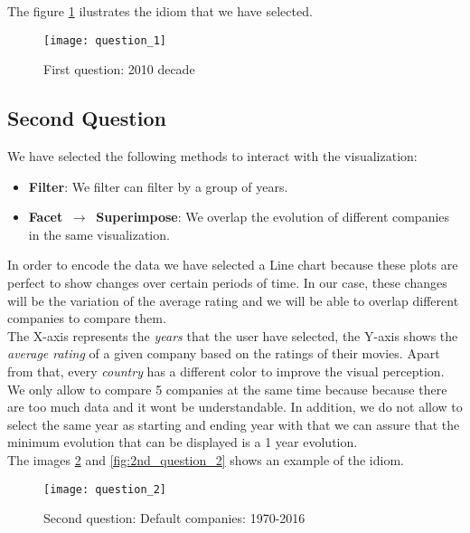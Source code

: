 The figure \ref{fig:1st_question} ilustrates the idiom that we have selected.

\begin{figure}[H]
	\texttt{[image: question\_1]}
	\caption{First question: 2010 decade}
	\label{fig:1st_question}
\end{figure}

\subsection{Second Question}

We have selected the following methods to interact with the visualization:

\begin{itemize}
	\item \textbf{Filter}: We filter can filter by a group of years.
	\item \textbf{Facet $\,\to\,$ Superimpose}: We overlap the evolution of different companies in the same visualization.
\end{itemize}

In order to encode the data we have selected a Line chart because these plots are perfect to show changes over certain periods of time. In our case, these changes will be the variation of the average rating and we will be able to overlap different companies to compare them.\\

The X-axis represents the \textit{years} that the user have selected, the Y-axis shows the \textit{average rating} of a given company based on the ratings of their movies. Apart from that, every \textit{country} has a different color to improve the visual perception.\\

We only allow to compare 5 companies at the same time because because there are too much data and it wont be understandable. In addition, we do not allow to select the same year as starting and ending year with that we can assure that the minimum evolution that can be displayed is a 1 year evolution. \\

The images \ref{fig:2nd_question} and \ref{fig:2nd_question_2} shows an example of the idiom.

\begin{figure}[H]
	\texttt{[image: question\_2]}
	\caption{Second question: Default companies: 1970-2016}
	\label{fig:2nd_question}
\end{figure}

